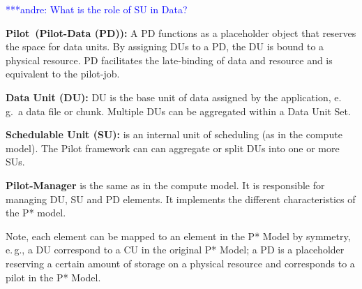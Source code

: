 \documentclass[conference,final]{IEEEtran}
\makeatletter
\def\reduwave{\bgroup \markoverwith{\lower3.5\p@\hbox{\sixly \textcolor{red}{\char58}}}\ULon}
\newcommand{\jwave}[1]{ {\reduwave{#1}}}
\newcommand{\jhanote}[1]{ {\textcolor{red} { ***shantenu: #1 }}}
\newcommand{\alnote}[1]{ {\textcolor{blue} { ***andre: #1 }}}
\newcommand{\jwave}[1]{#1}
\newcommand{\alnote}[1]{}
\newcommand{\jhanote}[1]{}
\newcommand{\pilot}{Pilot\xspace}
\newcommand{\cu}{CU\xspace}
\makeatother
\begin{document}
\alnote{What is the role of SU in Data?}
\begin{compactenum}[A.]

\item \textbf{\pilot \ (Pilot-Data  (PD)):} A PD functions as a placeholder
	  object that reserves the space for data units.  By assigning
	  DUs to a PD, the DU is bound to a physical resource.  PD
	  facilitates the late-binding of data and resource and is equivalent
	  to the pilot-job.

\item \textbf{Data Unit (DU):} DU is the base unit of data assigned by
  the application,  e.\,g.\ a data file or chunk. Multiple DUs can be aggregated 
   within a Data Unit Set.


\item \textbf{Schedulable Unit (SU):} is an internal unit of scheduling (as in 
the compute model). The Pilot framework can can aggregate or split DUs into one 
or more SUs.

\item \textbf{Pilot-Manager} is the same as in the compute model. It is
  responsible for managing DU, SU and PD elements. It implements the
  different characteristics of the P* model.
\end{compactenum}
 
Note, each element can be mapped to an element in the P* Model by
symmetry, e.\,g., a DU correspond to a \cu  in the original P* Model; 
a PD is a placeholder reserving a certain amount of storage on a physical 
resource and corresponds to a pilot in the P* Model.


\end{document}
